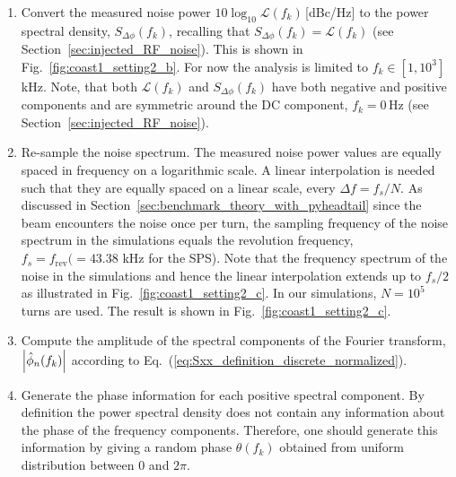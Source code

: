 \begin{enumerate}
    \item  Convert the measured noise power $10\log_{10}\mathcal{L}(f_k)$\,[dBc/Hz] to the power spectral density, $S_{\Delta \phi}(f_k)$, recalling that $S_{\Delta \phi}(f_k) = \mathcal{L}(f_k)$ (see Section~\ref{sec:injected_RF_noise}). This is shown in Fig.~\ref{fig:coast1_setting2_b}. For now the analysis is limited to $f_k \in [1, 10^{3}]$\,kHz. Note, that both $\mathcal{L}(f_k)$ and $S_{\Delta \phi}(f_k)$ have both negative and positive components and are symmetric around the DC component, $f_k=0$\,Hz (see Section~\ref{sec:injected_RF_noise}).

    \item Re-sample the noise spectrum. The measured noise power values are equally spaced in frequency on a logarithmic scale. A linear interpolation is needed such that they are equally spaced on a linear scale, every $\Delta f = f_s/N$. As discussed in Section~\ref{sec:benchmark_theory_with_pyheadtail} since the beam encounters the noise once per turn, the sampling frequency of the noise spectrum in the simulations equals the revolution frequency, $f_s=f_\mathrm{rev}(=43.38$ kHz for the SPS). Note that the frequency spectrum of the noise in the simulations and hence the linear interpolation extends up to $f_s/2$ as illustrated in Fig.~\ref{fig:coast1_setting2_c}. In our simulations, $N=10^5$ turns are used. The result is shown in Fig.~\ref{fig:coast1_setting2_c}.
    \item Compute the amplitude of the spectral components of the Fourier transform, $\left | \hat{\phi}_n(f_k) \right | $ according to Eq.~(\ref{eq:Sxx_definition_discrete_normalized}). %
    \item Generate the phase information for each positive spectral component. By definition the power spectral density does not contain any information about the phase of the frequency components. Therefore, one should generate this information by giving a random phase $\theta(f_k)$ obtained from uniform distribution between 0 and $2\pi$.

\end{enumerate}
